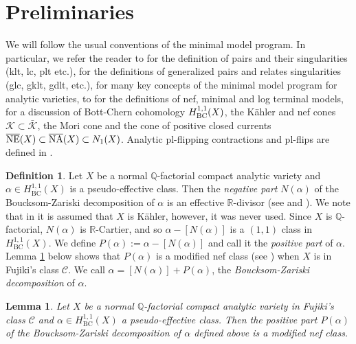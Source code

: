 \documentclass[12pt]{amsart}
\theoremstyle{plain}
\newtheorem{lemma}[theorem]{Lemma}
\theoremstyle{remark}
\theoremstyle{definition}
\def\BC{\operatorname{BC}}
\newcommand{\<}{\leq}
\newcommand{\mbQ}{\mathbb{Q}}
\newcommand{\mbR}{\mathbb{R}}
\def\mcC{\mathcal{C}}
\theoremstyle{definition}
\newtheorem{definition}[theorem]{Definition}
\theoremstyle{definition}
\numberwithin{equation}{section}
\theoremstyle{remark}
\begin{document}
\section{Preliminaries}\label{sec:prelim}
We will follow the usual conventions of the minimal model program. In particular, we refer the reader to \cite[Chapter 2]{KM98} for the definition of pairs and their singularities (klt, lc, plt etc.), \cite[Subsection 2.1]{DHY23} for the definitions of generalized pairs and relates singularities (glc, gklt, gdlt, etc.), \cite[Chapters 2, 3, 11]{Fuj22} for many key concepts of the minimal model program for analytic varieties, to \cite[Definition 2.8]{DHP22} for the definitions of nef, minimal and log terminal models, \cite{HP16} for a discussion of Bott-Chern cohomology $H^{1,1}_{\rm BC}(X)$, the  K\"ahler and nef cones $\mathcal K\subset \bar {\mathcal K}$, the Mori cone and the cone of positive closed currents $\overline{\rm NE}(X)\subset \overline {\rm NA}(X)\subset N_1(X)$.  Analytic pl-flipping contractions and pl-flips are defined in \cite[Chapter 15]{Fuj22}.



\begin{definition}\label{def:mod-nef}
Let $X$ be a normal $\mbQ$-factorial compact analytic variety and $\alpha\in H^{1,1}_{\BC}(X)$ is a pseudo-effective class. Then the \emph{negative part} $N(\alpha)$ of the Boucksom-Zariski decomposition of $\alpha$ is an effective $\mbR$-divisor (see \cite[Defintion A.6]{DHY23} and \cite[Definition 3.7]{Bou04}). We note that in \cite[Definition  A.6]{DHY23} it is assumed that $X$ is K\"ahler, however, it was never used. Since $X$ is $\mbQ$-factorial, $N(\alpha)$ is $\mbR$-Cartier, and so $\alpha-[N(\alpha)]$ is a $(1,1)$ class in $H^{1,1}_{\BC}(X)$. We define $P(\alpha):=\alpha-[N(\alpha)]$ and call it the \emph{positive part} of $\alpha$. Lemma \ref{lem:positive-part} below shows that $P(\alpha)$ is a modified nef class (see \cite[Definition 2.2(ii)]{Bou04}) when $X$ is in Fujiki's class $\mcC$. We call $\alpha=[N(\alpha)]+P(\alpha)$, the \emph{ Boucksom-Zariski decomposition} of $\alpha$.  
\end{definition}

\begin{lemma}\label{lem:positive-part}
    Let $X$ be a normal $\mbQ$-factorial compact analytic variety in Fujiki's class $\mcC$ and $\alpha\in H^{1,1}_{\BC}(X)$ a pseudo-effective class. Then the positive part $P(\alpha)$ of the Boucksom-Zariski decomposition of $\alpha$ defined above is a modified nef class.
\end{lemma}
\end{document}

